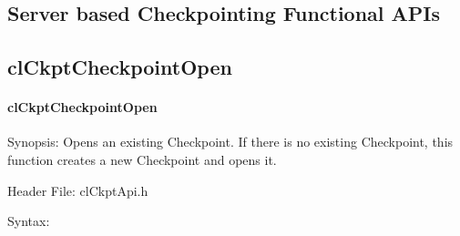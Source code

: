 \begin{flushleft}
\section{Server based Checkpointing Functional APIs}
\subsection{clCkptCheckpointOpen}
\hypertarget{pageckpt103}{}\paragraph{cl\-Ckpt\-Checkpoint\-Open}\label{pageckpt103}
\begin{Desc}
\item[Synopsis:]Opens an existing Checkpoint. If there is no existing Checkpoint, this function creates a new Checkpoint and opens it.\end{Desc}
\begin{Desc}
\item[Header File:]clCkptApi.h\end{Desc}
\begin{Desc}
\item[Syntax:]


\end{Desc}
\end{flushleft}
